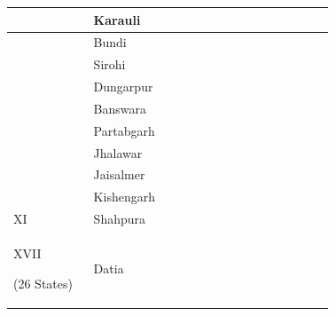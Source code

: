 \begin{longtable}{|p{0.23\linewidth}|p{0.23\linewidth}|p{0.23\linewidth}|p{0.23\linewidth}|}
 \\
\hline
 & Karauli

 \\
\hline
 & Bundi

 \\
\hline
 & Sirohi

 \\
\hline
 & Dungarpur

 \\
\hline
 & Banswara

 \\
\hline
 & Partabgarh

 \\
\hline
 & Jhalawar

 \\
\hline
 & Jaisalmer

 \\
\hline
 & Kishengarh

 \\
\hline
XI

 & Shahpura

 \\
\hline
\multirow{25}{*}{XVII

























(26 States)























} & Datia

 & \multirow{26}{*}{

























}
\end{longtable}
